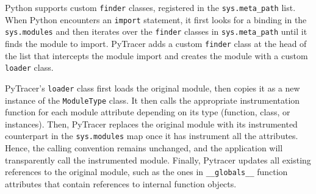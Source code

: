 \documentclass[11pt]{article}
\newcommand{\tristan}[1]{\color{orange}\textbf{From Tristan:} #1\color{black}\xspace}
\newcommand{\Yohan}[1]{\color{green!75!black}\textbf{Yohan:} #1\color{black}\xspace}
\newcommand{\pytracer}[0]{PyTracer\xspace}
\begin{document}
Python supports custom \texttt{finder} classes, registered in the \texttt{sys.meta\_path} list.
When Python encounters an \texttt{import} statement, it first looks for a binding in the \texttt{sys.modules}
and then iterates over the \texttt{finder} classes in \texttt{sys.meta\_path} until it finds the module to import. \pytracer adds a custom \texttt{finder} class at the head of the list that intercepts
the module import and creates the module with a custom \texttt{loader} class.

\pytracer's \texttt{loader} class first loads the original module, then copies it as a new instance of the \texttt{ModuleType} class. It then calls the appropriate instrumentation function for each module attribute depending on its type (function, class, or instances). Then, \pytracer replaces the original module with its instrumented counterpart in the \texttt{sys.modules} map once it has instrument all the attributes. Hence, the calling convention remains unchanged, and the application will transparently call the instrumented module. Finally, Pytracer updates all existing references to the original module, such as the ones in \texttt{\_\_globals\_\_} function attributes that contain references to internal function objects. 


\end{document}
